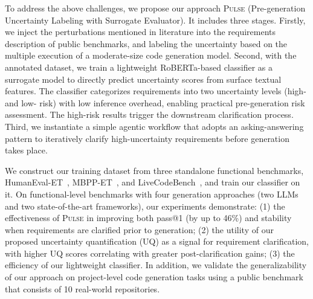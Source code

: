 
To address the above challenges, we propose our approach \textsc{Pulse} (Pre-generation Uncertainty Labeling with Surrogate Evaluator). It includes three stages. Firstly, we inject the perturbations mentioned in literature into the requirements description of public benchmarks, and labeling the uncertainty based on the multiple execution of a moderate-size code generation model. Second, with the annotated dataset, we train a lightweight RoBERTa-based classifier as a surrogate model to directly predict uncertainty scores from surface textual features. The classifier categorizes requirements into two uncertainty levels (high- and low- risk) with low inference overhead, enabling practical pre-generation risk assessment.  The high-risk results trigger the downstream clarification process. Third, we instantiate a simple agentic workflow that adopts an asking-answering pattern to iteratively clarify high-uncertainty requirements before generation takes place.

We construct our training dataset from three standalone functional benchmarks, HumanEval-ET~\cite{humaneval}, MBPP-ET~\cite{mbpp}, and LiveCodeBench~\cite{jain2025livecodebench}, and train our classifier on it. On functional-level benchmarks with four generation approaches (two LLMs and two state-of-the-art frameworks), our experiments demonstrate: (1)  the effectiveness of \textsc{Pulse} in improving both pass@1 (by up to 46\%) and stability when requirements are clarified prior to generation; (2) the utility of our proposed uncertainty quantification (UQ) as a signal for requirement clarification, with higher UQ scores correlating with greater post-clarification gains; (3) the efficiency of our lightweight classifier. In addition, we validate the generalizability of our approach on project-level code generation tasks using a public benchmark that consists of 10 real-world repositories.

